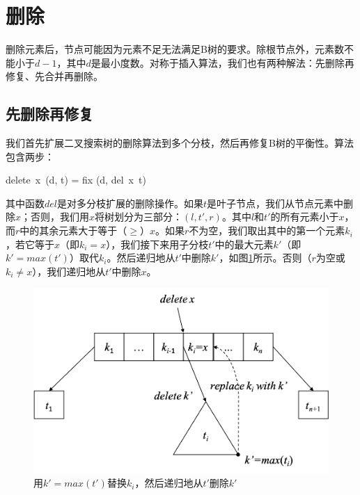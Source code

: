 \documentclass[b5paper]{ctexart}
\begin{document}
\begin{Exercise}
\end{Exercise}

\section{删除}

删除元素后，节点可能因为元素不足无法满足B树的要求。除根节点外，元素数不能小于$d - 1$，其中$d$是最小度数。对称于插入算法，我们也有两种解法：先删除再修复、先合并再删除。

\subsection{先删除再修复}

我们首先扩展二叉搜索树的删除算法到多个分枝，然后再修复B树的平衡性。算法包含两步：

\be
delete\ x\ (d, t) = fix (d, del\ x\ t)
\ee

其中函数$del$是对多分枝扩展的删除操作。如果$t$是叶子节点，我们从节点元素中删除$x$；否则，我们用$x$将树划分为三部分：$(l, t', r)$。其中$l$和$t'$的所有元素小于$x$，而$r$中的其余元素大于等于（$\geq$）$x$。如果$r$不为空，我们取出其中的第一个元素$k_i$，若它等于$x$（即$k_i = x$），我们接下来用子分枝$t'$中的最大元素$k'$（即$k' = max(t')$）取代$k_i$。然后递归地从$t'$中删除$k'$，如图\ref{fig:btree-del}所示。否则（$r$为空或$k_i \neq x$），我们递归地从$t'$中删除$x$。

\begin{figure}[htbp]
  \centering
  \includegraphics[scale=0.45]{img/btree-del}
  \caption{用$k' = max(t')$替换$k_i$，然后递归地从$t'$删除$k'$}
  \label{fig:btree-del}
\end{figure}
\end{document}
